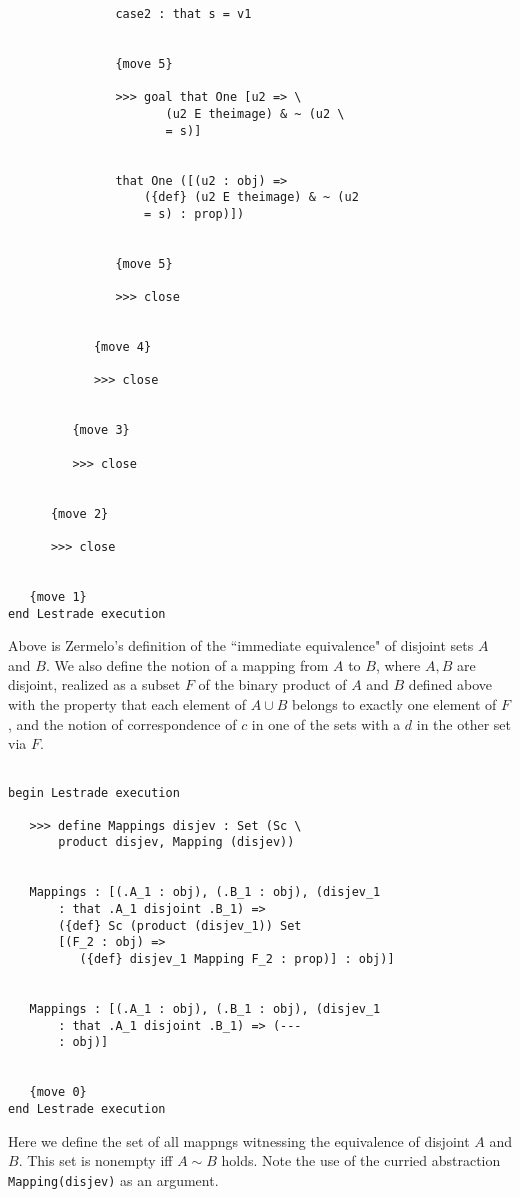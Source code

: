 \documentclass[12pt]{article}
\begin{document}
\begin{verbatim}
               case2 : that s = v1


               {move 5}

               >>> goal that One [u2 => \
                      (u2 E theimage) & ~ (u2 \
                      = s)]


               that One ([(u2 : obj) => 
                   ({def} (u2 E theimage) & ~ (u2 
                   = s) : prop)])


               {move 5}

               >>> close


            {move 4}

            >>> close


         {move 3}

         >>> close


      {move 2}

      >>> close


   {move 1}
end Lestrade execution
\end{verbatim}

Above is Zermelo's definition of the ``immediate equivalence" of disjoint sets $A$ and $B$.  We also define the notion of a mapping from $A$ to $B$, where $A,B$ are disjoint, 
realized as a subset $F$ of the binary product of $A$ and $B$ defined above with the property that each element of $A \cup B$ belongs to exactly one element of $F$, and the notion of correspondence of $c$ in one of the sets with a $d$ in the other set via $F$.

\begin{verbatim}

begin Lestrade execution

   >>> define Mappings disjev : Set (Sc \
       product disjev, Mapping (disjev))


   Mappings : [(.A_1 : obj), (.B_1 : obj), (disjev_1 
       : that .A_1 disjoint .B_1) => 
       ({def} Sc (product (disjev_1)) Set 
       [(F_2 : obj) => 
          ({def} disjev_1 Mapping F_2 : prop)] : obj)]


   Mappings : [(.A_1 : obj), (.B_1 : obj), (disjev_1 
       : that .A_1 disjoint .B_1) => (--- 
       : obj)]


   {move 0}
end Lestrade execution
\end{verbatim}

Here we define the set of all mappngs witnessing the equivalence of disjoint $A$ and $B$.  This set is nonempty iff $A \sim B$ holds.  Note the use of the curried abstraction
{\tt Mapping(disjev)} as an argument.
\end{document}
